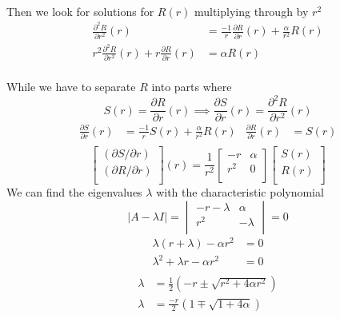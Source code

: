 \documentclass{article}
\begin{document}
\paragraph{}
Then we look for solutions for $R(r)$ multiplying through by $r^{2}$
\begin{align*}
\frac{\partial^{2} R}{\partial r^{2}}(r) &= \frac{-1}{r} \frac{\partial R}{\partial r}(r) + \frac{\alpha}{r^{2}} R(r)\\
 r^{2}\frac{\partial^{2} R}{\partial r^{2}}(r) +r \frac{\partial R}{\partial r}(r) &= \alpha R(r)\\
\end{align*}

While we have to separate $R$ into parts where
\[ S(r) = \frac{\partial R}{\partial r} (r) \implies \frac{\partial S}{\partial r} (r) =  \frac{\partial^{2} R}{\partial r^{2}} (r) \]
\begin{align*}
\frac{\partial S}{\partial r}(r) &= \frac{-1}{r} S(r) + \frac{\alpha}{r^{2}} R(r)
&
\frac{\partial R}{\partial r} (r) &= S(r)\\
\end{align*}
\[
\boxed{\begin{bmatrix}
(\partial S/\partial r) \\
(\partial R/\partial r) \\
\end{bmatrix}
(r) = 
\frac{1}{r^{2}}
\begin{bmatrix}
-r	&	\alpha	\\
r^{2}	&	0	\\
\end{bmatrix}
\begin{bmatrix}
S(r)	\\
R(r)	\\
\end{bmatrix}}
\]
We can find the eigenvalues $\lambda$ with the characteristic polynomial
\[ |A-\lambda I| = \begin{vmatrix}
-r - \lambda	&	\alpha		\\
r^{2}			&	-\lambda	\\
\end{vmatrix} = 0 \]
\begin{align*}
\lambda(r + \lambda) - \alpha r^{2} &= 0\\
\lambda^{2} + \lambda r - \alpha r^{2} &= 0\\
\end{align*}
\begin{align*}
\lambda &= \frac{1}{2}\left( -r \pm \sqrt{r^{2} + 4\alpha r^{2}} \right)\\
\lambda &= \boxed{\frac{-r}{2}\left( 1 \mp \sqrt{1 + 4\alpha} \right)}
\end{align*}
\end{document}
